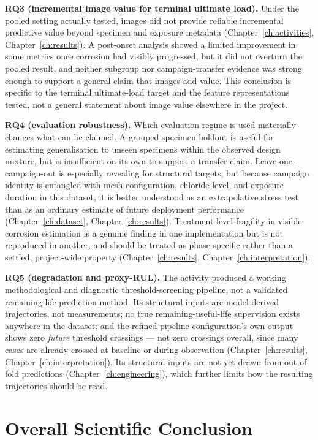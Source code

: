 \textbf{RQ3 (incremental image value for terminal ultimate load).} Under
the pooled setting actually tested, images did not provide reliable
incremental predictive value beyond specimen and exposure metadata
(Chapter~\ref{ch:activities}, Chapter~\ref{ch:results}). A post-onset
analysis showed a limited improvement in some metrics once corrosion had
visibly progressed, but it did not overturn the pooled result, and
neither subgroup nor campaign-transfer evidence was strong enough to
support a general claim that images add value. This conclusion is specific to the terminal
ultimate-load target and the feature representations tested, not a
general statement about image value elsewhere in the project.

\textbf{RQ4 (evaluation robustness).} Which evaluation regime is used
materially changes what can be claimed. A grouped specimen holdout is
useful for estimating generalisation to unseen specimens within the
observed design mixture, but is insufficient on its own to support a
transfer claim. Leave-one-campaign-out is especially revealing for
structural targets, but because campaign identity is entangled with mesh
configuration, chloride level, and exposure duration in this dataset, it
is better understood as an extrapolative stress test than as an ordinary
estimate of future deployment performance
(Chapter~\ref{ch:dataset}, Chapter~\ref{ch:results}). Treatment-level
fragility in visible-corrosion estimation is a genuine finding in one
implementation but is not reproduced in another, and should be treated as
phase-specific rather than a settled, project-wide property
(Chapter~\ref{ch:results}, Chapter~\ref{ch:interpretation}).

\textbf{RQ5 (degradation and proxy-RUL).} The activity produced a working
methodological and diagnostic threshold-screening pipeline, not a
validated remaining-life prediction method. Its structural inputs are
model-derived trajectories, not measurements; no true remaining-useful-life
supervision exists anywhere in the dataset; and the refined pipeline
configuration's own output shows zero \emph{future} threshold crossings —
not zero crossings overall, since many cases are already crossed at
baseline or during observation
(Chapter~\ref{ch:results}, Chapter~\ref{ch:interpretation}). Its
structural inputs are not yet drawn from out-of-fold predictions
(Chapter~\ref{ch:engineering}), which further limits how the resulting
trajectories should be read.

\section{Overall Scientific Conclusion}
\label{sec:conclusions-overall}

